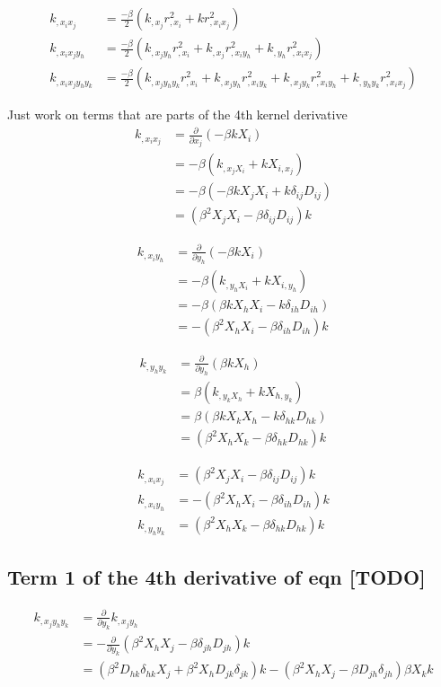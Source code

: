 \begin{align}
k_{,x_i x_j} &= \frac{-\beta}{2}(k_{,x_j} r^2_{,x_i} + k r^2_{,x_i x_j})\\
k_{,x_i x_j y_h} &= \frac{-\beta}{2}(k_{,x_j y_h} r^2_{,x_i} + k_{,x_j}
r^2_{,x_i y_h} + k_{,y_h} r^2_{,x_i x_j})\\
k_{,x_i x_j y_h y_k} &= \frac{-\beta}{2} 
(k_{,x_j y_h y_k} r^2_{,x_i} +
k_{,x_j y_h} r^2_{,x_i y_k} + 
k_{,x_j y_k} r^2_{,x_i y_h} + 
k_{,y_h y_k} r^2_{,x_i x_j} )
\end{align}

Just work on terms that are parts of the 4th kernel derivative 
\begin{align*}
k_{,x_i x_j} &= \frac{\partial}{\partial x_j} (-\beta k X_i)\\
&= -\beta(k_{,x_j X_i} + k X_{i, x_j})\\ 
&= -\beta(-\beta k X_j X_i + k \delta_{ij} D_{ij}) \\ 
&= (\beta^2 X_j X_i - \beta \delta_{ij} D_{ij})k 
\end{align*}

\begin{align*}
k_{,x_i y_h} &= \frac{\partial}{\partial y_h} (-\beta k X_i)\\
&= -\beta(k_{,y_h X_i} + k X_{i, y_h})\\ 
&= -\beta(\beta k X_h X_i - k \delta_{ih} D_{ih}) \\ 
&= -(\beta^2 X_h X_i - \beta \delta_{ih} D_{ih})k 
\end{align*}

\begin{align*}
k_{,y_h y_k} &= \frac{\partial}{\partial y_h} (\beta k X_h)\\
&= \beta(k_{,y_k X_h} + k X_{h, y_k})\\ 
&= \beta(\beta k X_k X_h - k \delta_{hk} D_{hk}) \\ 
&= (\beta^2 X_h X_k - \beta \delta_{hk} D_{hk})k 
\end{align*}

\begin{align}
k_{,x_i x_j} &= (\beta^2 X_j X_i - \beta \delta_{ij} D_{ij})k\\ 
k_{,x_i y_h} &= -(\beta^2 X_h X_i - \beta \delta_{ih} D_{ih})k\\ 
k_{,y_h y_k} &= (\beta^2 X_h X_k - \beta \delta_{hk} D_{hk})k 
\end{align}

\subsection{Term 1 of the 4th derivative of eqn [TODO]}
\begin{align*}
k_{,x_j y_h y_k}
&= \frac{\partial}{\partial y_k} k_{,x_j y_h}\\ 
&= -\frac{\partial}{\partial y_k} (\beta^2 X_h X_j - \beta \delta_{jh} D_{jh})k\\
&= (\beta^2 D_{hk} \delta_{hk} X_j + \beta^2 X_h D_{jk}\delta_{jk})k -
(\beta^2 X_h X_j - \beta D_{jh} \delta_{jh})\beta X_k k
\end{align*}

